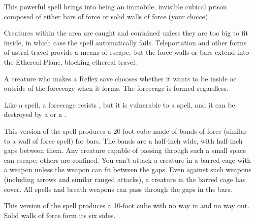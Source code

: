 \spellrng{\rngmed}
\begin{spelleffect}
  This powerful spell brings into being an immobile, invisible cubical prison composed of either bars of force or solid walls of force (your choice).
  \par Creatures within the area are caught and contained unless they are too big to fit inside, in which case the spell automatically fails. Teleportation and other forms of astral travel provide a means of escape, but the force walls or bars extend into the Ethereal Plane, blocking ethereal travel.
  \par A creature who makes a Reflex save chooses whether it wants to be inside or outside of the forcecage when it forms. The forcecage is formed regardless.
  \par Like a  spell, a forcecage resists , but it is vulnerable to a  spell, and it can be destroyed by a  or a .
  \par {} This version of the spell produces a 20-foot cube made of bands of force (similar to a wall of force spell) for bars. The bands are a half-inch wide, with half-inch gaps between them. Any creature capable of passing through such a small space can escape; others are confined. You can't attack a creature in a barred cage with a weapon unless the weapon can fit between the gaps. Even against such weapons (including arrows and similar ranged attacks), a creature in the barred cage has cover. All spells and breath weapons can pass through the gaps in the bars.
  \par {} This version of the spell produces a 10-foot cube with no way in and no way out. Solid walls of force form its six sides.
\end{spelleffect}

